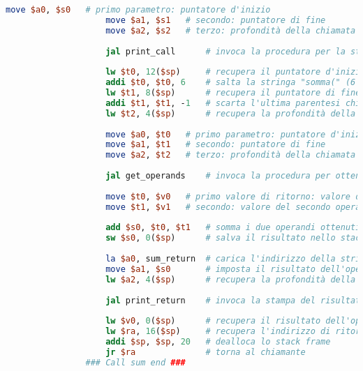 \begin{center}
\begin{lstlisting}[language=mips, gobble=14, stepnumber=1]
                    move $a0, $s0   # primo parametro: puntatore d'inizio
                    move $a1, $s1   # secondo: puntatore di fine
                    move $a2, $s2   # terzo: profondità della chiamata
                    
                    jal print_call      # invoca la procedura per la stampa dell'invocazione (con gli stessi parametri)
                    
                    lw $t0, 12($sp)     # recupera il puntatore d'inizio dallo stack
                    addi $t0, $t0, 6    # salta la stringa "somma(" (6 caratteri)
                    lw $t1, 8($sp)      # recupera il puntatore di fine
                    addi $t1, $t1, -1   # scarta l'ultima parentesi chiusa
                    lw $t2, 4($sp)      # recupera la profondità della chiamata
                    
                    move $a0, $t0   # primo parametro: puntatore d'inizio
                    move $a1, $t1   # secondo: puntatore di fine
                    move $a2, $t2   # terzo: profondità della chiamata
                    
                    jal get_operands    # invoca la procedura per ottenere gli operandi
                    
                    move $t0, $v0   # primo valore di ritorno: valore del primo operando
                    move $t1, $v1   # secondo: valore del secondo operando
                    
                    add $s0, $t0, $t1   # somma i due operandi ottenuti
                    sw $s0, 0($sp)      # salva il risultato nello stack
                    
                    la $a0, sum_return  # carica l'indirizzo della stringa sum_return (primo parametro)
                    move $a1, $s0       # imposta il risultato dell'operazione come secondo parametro
                    lw $a2, 4($sp)      # recupera la profondità della chiamata (terzo parametro)
                    
                    jal print_return    # invoca la stampa del risultato con questi tre parametri
                    
                    lw $v0, 0($sp)      # recupera il risultato dell'operazione
                    lw $ra, 16($sp)     # recupera l'indirizzo di ritorno
                    addi $sp, $sp, 20   # dealloca lo stack frame
                    jr $ra              # torna al chiamante
                ### Call sum end ###
                

\end{lstlisting}
\end{center}
